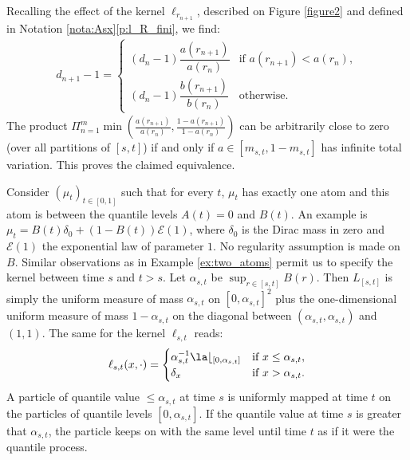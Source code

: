 \begin{ex}
Recalling the effect of the kernel $\ell_{r_{n+1}}$, described on Figure \ref{figure2} and defined in Notation \ref{nota:Asx}\eqref{p:l_R_fini}, we find:\vspace*{-5pt}
\begin{align*}
d_{n+1}-1=
\begin{cases}
(d_{n}-1)\dfrac{a(r_{n+1})}{a(r_n)}&\text{if }a(r_{n+1})<a(r_n),\\[8pt]
(d_n-1)\dfrac{b(r_{n+1})}{b(r_n)}&\text{otherwise.}
\end{cases}
\end{align*}
The product $\Pi_{n=1}^m\min(\frac{a(r_{n+1})}{a(r_n)},\frac{1-a(r_{n+1})}{1-a(r_n)})$ can be arbitrarily close to zero (over all partitions of $[s,t]$) if and only if $a\in[m_{s,t},1-m_{s,t}]$ has infinite total variation. This proves the claimed equivalence.
\end{ex}

\begin{ex}\label{ex:exponential}
Consider $(\mu_t)_{t\in{[0,1]}}$ such that for every $t$, $\mu_t$ has exactly one atom and this atom is between the quantile levels $A(t)=0$ and $B(t)$. An example is $\mu_t=B(t)\delta_0+(1-B(t))\mathcal{E}(1)$, where $\delta_0$ is the Dirac mass in zero and $\mathcal{E}(1)$ the exponential law of parameter $1$. No regularity assumption is made on $B$. Similar observations as in Example \ref{ex:two_atoms} permit us to specify the kernel between time $s$ and $t>s$. Let $\alpha_{s,t}$ be $\sup_{r\in[s,t]}B(r)$. Then $L_{[s,t]}$ is simply the uniform measure of mass $\alpha_{s,t}$ on $[0,\alpha_{s,t}]^2$ plus the one-dimensional uniform measure of mass $1-\alpha_{s,t}$ on the diagonal between $(\alpha_{s,t},\alpha_{s,t})$ and $(1,1)$. The same for the kernel $\ell_{s,t}$ reads:
\[
\ell_{s,t}(x,\cdot)=
\begin{cases}
\alpha_{s,t}^{-1}\la\lfloor_{[0,\alpha_{s,t}]}&\text{if }x\leq \alpha_{s,t},\\
\delta_x&\text{if }x>\alpha_{s,t}.
\end{cases}
\]
A particle of quantile value $\leq \alpha_{s,t}$ at time $s$ is uniformly mapped at time $t$ on the particles of quantile levels $[0,\alpha_{s,t}]$. If the quantile value at time $s$ is greater that $\alpha_{s,t}$, the particle keeps on with the same level until time $t$ as if it were the quantile process.
\end{ex}


